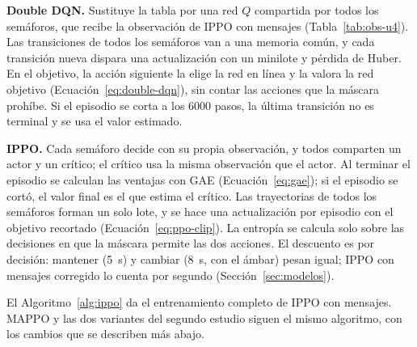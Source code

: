 \noindent\textbf{Double DQN.} Sustituye la tabla por una red $Q$
compartida por todos los semáforos, que recibe la observación de IPPO
con mensajes (Tabla~\ref{tab:obs-u4}). Las transiciones de todos los
semáforos van a una memoria común, y cada transición nueva dispara una
actualización con un minilote y pérdida de Huber. En el objetivo, la
acción siguiente la elige la red en línea y la valora la red objetivo
(Ecuación~\ref{eq:double-dqn}), sin contar las acciones que la máscara
prohíbe. Si el episodio se corta a los 6000 pasos, la última transición
no es terminal y se usa el valor estimado.

\noindent\textbf{IPPO.} Cada semáforo decide con su propia observación,
y todos comparten un actor y un crítico; el crítico usa la misma
observación que el actor. Al terminar el episodio se calculan las
ventajas con GAE (Ecuación~\ref{eq:gae}); si el episodio se cortó, el
valor final es el que estima el crítico. Las trayectorias de todos los
semáforos forman un solo lote, y se hace una actualización por episodio
con el objetivo recortado (Ecuación~\ref{eq:ppo-clip}). La entropía se
calcula solo sobre las decisiones en que la máscara permite las dos
acciones. El descuento es por decisión: mantener (5~s) y cambiar (8~s,
con el ámbar) pesan igual; IPPO con mensajes corregido lo cuenta por
segundo (Sección~\ref{sec:modelos}).

El Algoritmo~\ref{alg:ippo} da el entrenamiento completo de IPPO con
mensajes. MAPPO y las dos variantes del segundo estudio siguen el mismo
algoritmo, con los cambios que se describen más abajo.

